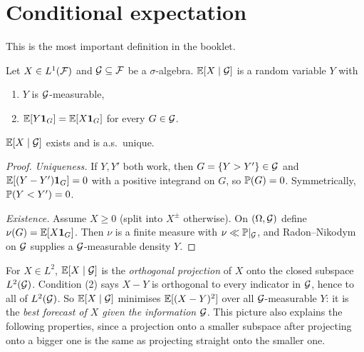 \section{Conditional expectation}

This is the most important definition in the booklet.

\begin{definition}\label{def:condexp}
Let $X\in L^1(\mathcal{F})$ and $\mathcal{G}\subseteq\mathcal{F}$ be a $\sigma$-algebra. $\mathbb{E}[X\mid\mathcal{G}]$ is a random variable $Y$ with
\begin{enumerate}
\item $Y$ is $\mathcal{G}$-measurable,
\item $\mathbb{E}[Y\mathbf{1}_G]=\mathbb{E}[X\mathbf{1}_G]$ for every $G\in\mathcal{G}$.
\end{enumerate}
\end{definition}

\begin{theorem}
$\mathbb{E}[X\mid\mathcal{G}]$ exists and is a.s.\ unique.
\end{theorem}
\begin{proof}
\emph{Uniqueness.} If $Y,Y'$ both work, then $G=\{Y>Y'\}\in\mathcal{G}$ and $\mathbb{E}[(Y-Y')\mathbf{1}_G]=0$ with a positive integrand on $G$, so $\mathbb{P}(G)=0$. Symmetrically, $\mathbb{P}(Y<Y')=0$.

\emph{Existence.} Assume $X\ge0$ (split into $X^\pm$ otherwise). On $(\Omega,\mathcal{G})$ define $\nu(G)=\mathbb{E}[X\mathbf{1}_G]$. Then $\nu$ is a finite measure with $\nu\ll\mathbb{P}|_{\mathcal{G}}$, and Radon--Nikodym on $\mathcal{G}$ supplies a $\mathcal{G}$-measurable density $Y$.
\end{proof}

\begin{intuition}
For $X\in L^2$, $\mathbb{E}[X\mid\mathcal{G}]$ is the \emph{orthogonal projection} of $X$ onto the closed subspace $L^2(\mathcal{G})$. Condition (2) says $X-Y$ is orthogonal to every indicator in $\mathcal{G}$, hence to all of $L^2(\mathcal{G})$. So $\mathbb{E}[X\mid\mathcal{G}]$ minimises $\mathbb{E}[(X-Y)^2]$ over all $\mathcal{G}$-measurable $Y$: it is the \emph{best forecast of $X$ given the information $\mathcal{G}$}. This picture also explains the following properties, since a projection onto a smaller subspace after projecting onto a bigger one is the same as projecting straight onto the smaller one.
\end{intuition}


